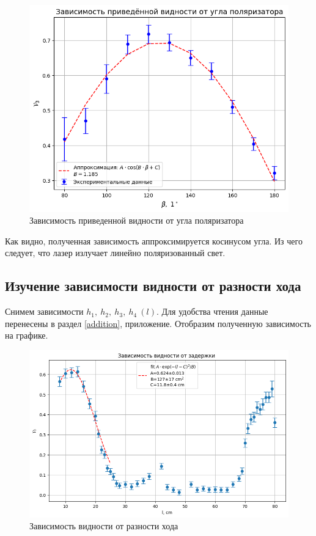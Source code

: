\documentclass[12pt, a4paper]{article}
\begin{document}
\begin{figure}[H]
    \centering
    \includegraphics[width = 0.85\linewidth]{pics/2.png}
    \caption{Зависимость приведенной видности от угла поляризатора}
\end{figure}
Как видно, полученная зависимость аппроксимируется косинусом угла. Из чего следует, что лазер излучает линейно поляризованный свет.

\subsection{Изучение зависимости видности от разности хода}
Снимем зависимости $h_1,~h_2,~h_3,~h_4~(l)$. Для удобства чтения данные
перенесены в раздел \ref{addition}, приложение. Отобразим полученную
зависимость на графике.
\begin{figure}[H]
    \centering
    \includegraphics[width = 0.85\linewidth]{pics/V3(L).png}
    \caption{Зависимость видности от разности хода}
\end{figure}
\end{document}
